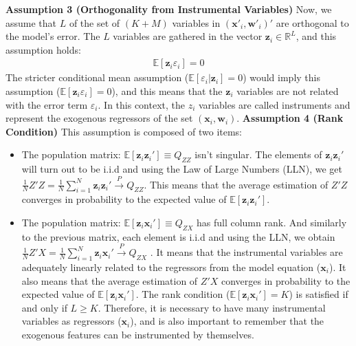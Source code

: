 \documentclass{article}
\begin{document}
\newline
\textbf{Assumption 3 (Orthogonality from Instrumental Variables)}
\newline
Now, we assume that $L$ of the set of $(K+M)$ variables in $({\textbf{x}'_{i}, \textbf{w}'_{i}})'$ are orthogonal to the model's error. The $L$ variables are gathered in the vector ${\textbf{z}_{i} \in \mathbb{R}^{L}}$, and this assumption holds:
\begin{align*}
\mathbb{E}[\textbf{z}_{i} \varepsilon_{i} ]=0
\end{align*}
The stricter conditional mean assumption ($\mathbb{E}[\varepsilon_{i}|\textbf{z}_{i}]=0$) would imply this assumption ($\mathbb{E}[\textbf{z}_{i} \varepsilon_{i} ]=0$), and this means that the $\textbf{z}_{i}$ variables are not related with the error term $\varepsilon_{i}$. In this context, the $z_{i}$ variables are called instruments and represent the exogenous regressors of the set $({\textbf{x}_{i}, \textbf{w}_{i}})$.
\newline
\textbf{Assumption 4 (Rank Condition)}
\newline
This assumption is composed of two items:
\begin{itemize}
\item The population matrix: $\mathbb{E}[\textbf{z}_{i} \textbf{z}_{i}' ] \equiv Q_{ZZ}$ isn't singular. The elements of $\textbf{z}_{i} \textbf{z}_{i}'$ will turn out to be i.i.d and using the Law of Large Numbers (LLN), we get $\frac{1}{N}Z'Z = \frac{1}{N} \sum_{i=1}^{N} \textbf{z}_{i} \textbf{z}_{i}' \xrightarrow{P} Q_{ZZ} $. This means that the average estimation of $Z'Z$ converges in probability to the expected value of $\mathbb{E}[\textbf{z}_{i} \textbf{z}_{i}']$.
\item The population matrix: $\mathbb{E}[\textbf{z}_{i} \textbf{x}_{i}' ] \equiv Q_{ZX}$ has full column rank. And similarly to the previous matrix, each element is i.i.d and using the LLN, we obtain  $\frac{1}{N}Z'X = \frac{1}{N} \sum_{i=1}^{N} \textbf{z}_{i} \textbf{x}_{i}' \xrightarrow{P} Q_{ZX} $ . It means that the instrumental variables are adequately linearly related to the regressors from the model equation ($\textbf{x}_{i}$). It also means that the average estimation of $Z'X$ converges in probability to the expected value of $\mathbb{E}[\textbf{z}_{i} \textbf{x}_{i}']$.  The rank condition ($\mathbb{E}[\textbf{z}_{i} \textbf{x}_{i}' ] = K $) is satisfied if and only if $L \geq K$. Therefore, it is necessary to have many instrumental variables as regressors ($\textbf{x}_{i}$), and is also important to remember that the exogenous features can be instrumented by themselves.
\end{itemize}
\end{document}
